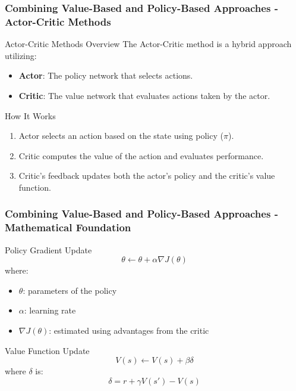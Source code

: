 \documentclass[aspectratio=169]{beamer}
\begin{document}
\begin{frame}[fragile]
    \frametitle{Combining Value-Based and Policy-Based Approaches - Actor-Critic Methods}
    \begin{block}{Actor-Critic Methods Overview}
        The Actor-Critic method is a hybrid approach utilizing:
        \begin{itemize}
            \item \textbf{Actor}: The policy network that selects actions.
            \item \textbf{Critic}: The value network that evaluates actions taken by the actor.
        \end{itemize}
    \end{block}
    
    \begin{block}{How It Works}
        \begin{enumerate}
            \item Actor selects an action based on the state using policy ($\pi$).
            \item Critic computes the value of the action and evaluates performance.
            \item Critic's feedback updates both the actor's policy and the critic's value function.
        \end{enumerate}
    \end{block}
\end{frame}

\begin{frame}[fragile]
    \frametitle{Combining Value-Based and Policy-Based Approaches - Mathematical Foundation}
    \begin{block}{Policy Gradient Update}
        \begin{equation}
            \theta \leftarrow \theta + \alpha \nabla J(\theta)
        \end{equation}
        where: 
        \begin{itemize}
            \item $\theta$: parameters of the policy
            \item $\alpha$: learning rate
            \item $\nabla J(\theta)$: estimated using advantages from the critic
        \end{itemize}
    \end{block}

    \begin{block}{Value Function Update}
        \begin{equation}
            V(s) \leftarrow V(s) + \beta \delta
        \end{equation}
        where $\delta$ is:
        \begin{equation}
            \delta = r + \gamma V(s') - V(s)
        \end{equation}
    \end{block}
\end{frame}
\end{document}
